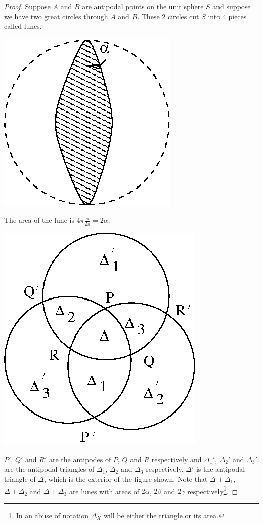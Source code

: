 \documentclass{notes}
\theoremstyle{plain}
\begin{document}
\begin{proof}
Suppose $A$ and $B$ are antipodal points on the unit sphere $S$ and suppose
we have two great circles through $A$ and $B$. These 2 circles cut $S$ into
4 pieces called lunes.

\begin{center}
\includegraphics{lune.eps}
\end{center}

The area of the lune is $4 \pi \frac{\alpha}{2 \pi} = 2 \alpha$.

\begin{center}
\includegraphics{triarea.eps}
\end{center}

$P'$, $Q'$ and $R'$ are the antipodes of $P$, $Q$ and $R$ respectively and
$\Delta_1'$, $\Delta_2'$ and $\Delta_3'$ are the antipodal triangles of
$\Delta_1$, $\Delta_2$ and $\Delta_3$ respectively.  $\Delta'$ is the antipodal
triangle of $\Delta$, which is the exterior of the figure shown.  Note
that $\Delta + \Delta_1$, $\Delta + \Delta_2$ and $\Delta + \Delta_3$ are lunes
with areas of $2 \alpha$, $2 \beta$ and $2 \gamma$ respectively\footnote{In an
abuse of notation $\Delta_X$ will be either the triangle or its area.}.


\end{proof}
\end{document}
